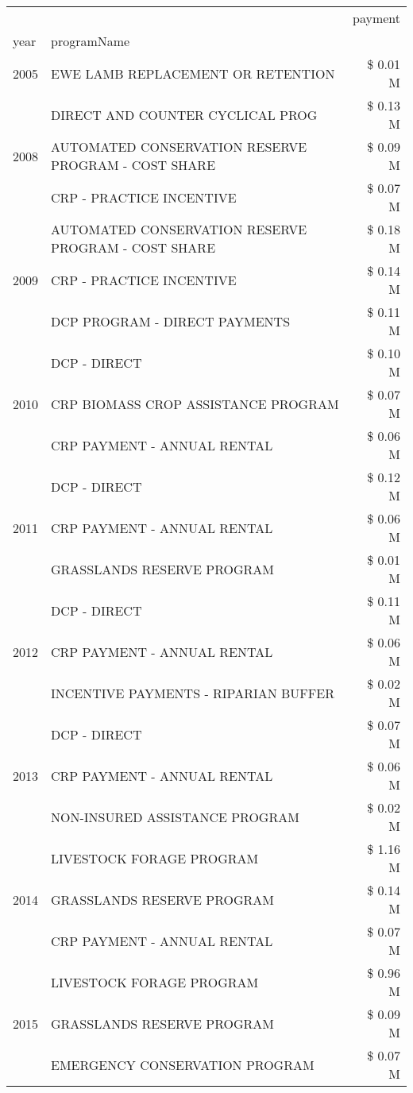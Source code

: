 \begin{tabular}{llr}
\toprule
 &  & payment \\
year & programName &  \\
\midrule
2005 & EWE LAMB REPLACEMENT OR RETENTION & \$ 0.01 M \\
\cline{1-3}
\multirow[t]{3}{*}{2008} & DIRECT AND COUNTER CYCLICAL PROG & \$ 0.13 M \\
 & AUTOMATED CONSERVATION RESERVE PROGRAM - COST SHARE & \$ 0.09 M \\
 & CRP - PRACTICE INCENTIVE & \$ 0.07 M \\
\cline{1-3}
\multirow[t]{3}{*}{2009} & AUTOMATED CONSERVATION RESERVE PROGRAM - COST SHARE & \$ 0.18 M \\
 & CRP - PRACTICE INCENTIVE & \$ 0.14 M \\
 & DCP PROGRAM - DIRECT PAYMENTS & \$ 0.11 M \\
\cline{1-3}
\multirow[t]{3}{*}{2010} & DCP - DIRECT & \$ 0.10 M \\
 & CRP BIOMASS CROP ASSISTANCE PROGRAM & \$ 0.07 M \\
 & CRP PAYMENT - ANNUAL RENTAL & \$ 0.06 M \\
\cline{1-3}
\multirow[t]{3}{*}{2011} & DCP - DIRECT & \$ 0.12 M \\
 & CRP PAYMENT - ANNUAL RENTAL & \$ 0.06 M \\
 & GRASSLANDS RESERVE PROGRAM & \$ 0.01 M \\
\cline{1-3}
\multirow[t]{3}{*}{2012} & DCP - DIRECT & \$ 0.11 M \\
 & CRP PAYMENT - ANNUAL RENTAL & \$ 0.06 M \\
 & INCENTIVE PAYMENTS - RIPARIAN BUFFER & \$ 0.02 M \\
\cline{1-3}
\multirow[t]{3}{*}{2013} & DCP - DIRECT & \$ 0.07 M \\
 & CRP PAYMENT - ANNUAL RENTAL & \$ 0.06 M \\
 & NON-INSURED ASSISTANCE PROGRAM & \$ 0.02 M \\
\cline{1-3}
\multirow[t]{3}{*}{2014} & LIVESTOCK FORAGE PROGRAM & \$ 1.16 M \\
 & GRASSLANDS RESERVE PROGRAM & \$ 0.14 M \\
 & CRP PAYMENT - ANNUAL RENTAL & \$ 0.07 M \\
\cline{1-3}
\multirow[t]{3}{*}{2015} & LIVESTOCK FORAGE PROGRAM & \$ 0.96 M \\
 & GRASSLANDS RESERVE PROGRAM & \$ 0.09 M \\
 & EMERGENCY CONSERVATION PROGRAM & \$ 0.07 M \\

\end{tabular}
